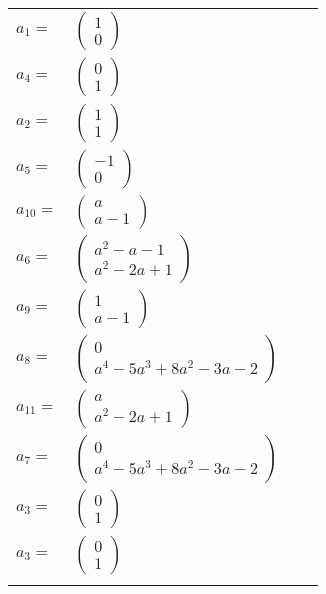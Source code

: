 \documentclass[1p]{elsarticle_modified}
\theoremstyle{definition}
\begin{document}
\begin{tabular}{m{7pt} m{180pt} m{7pt} m{180pt} }
\flushright $a_{1}=$&$\begin{pmatrix}1\\0\end{pmatrix}$ \\
\flushright $a_{4}=$&$\begin{pmatrix}0\\1\end{pmatrix}$ \\
\flushright $a_{2}=$&$\begin{pmatrix}1\\1\end{pmatrix}$ \\
\flushright $a_{5}=$&$\begin{pmatrix}-1\\0\end{pmatrix}$ \\
\flushright $a_{10}=$&$\begin{pmatrix}a\\a-1\end{pmatrix}$ \\
\flushright $a_{6}=$&$\begin{pmatrix}a^2- a-1\\a^2-2 a+1\end{pmatrix}$ \\
\flushright $a_{9}=$&$\begin{pmatrix}1\\a-1\end{pmatrix}$ \\
\flushright $a_{8}=$&$\begin{pmatrix}0\\a^4-5 a^3+8 a^2-3 a-2\end{pmatrix}$ \\
\flushright $a_{11}=$&$\begin{pmatrix}a\\a^2-2 a+1\end{pmatrix}$ \\
\flushright $a_{7}=$&$\begin{pmatrix}0\\a^4-5 a^3+8 a^2-3 a-2\end{pmatrix}$ \\
\flushright $a_{3}=$&$\begin{pmatrix}0\\1\end{pmatrix}$\\ \flushright $a_{3}=$&$\begin{pmatrix}0\\1\end{pmatrix}$\\&\end{tabular}
\end{document}
